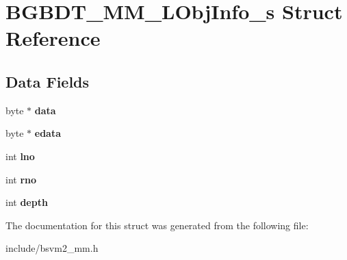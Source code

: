 \hypertarget{structBGBDT__MM__LObjInfo__s}{\section{B\-G\-B\-D\-T\-\_\-\-M\-M\-\_\-\-L\-Obj\-Info\-\_\-s Struct Reference}
\label{structBGBDT__MM__LObjInfo__s}
}
\subsection*{Data Fields}
\begin{DoxyCompactItemize}
\item 
\hypertarget{structBGBDT__MM__LObjInfo__s_a7348aaf7ba86ba7266399ae3ebfab625}{byte $\ast$ {\bfseries data}}\label{structBGBDT__MM__LObjInfo__s_a7348aaf7ba86ba7266399ae3ebfab625}

\item 
\hypertarget{structBGBDT__MM__LObjInfo__s_ab815aae7cf0237171e381a2a58d46a44}{byte $\ast$ {\bfseries edata}}\label{structBGBDT__MM__LObjInfo__s_ab815aae7cf0237171e381a2a58d46a44}

\item 
\hypertarget{structBGBDT__MM__LObjInfo__s_a8b0935b9838161a3a08265f5bd9ba571}{int {\bfseries lno}}\label{structBGBDT__MM__LObjInfo__s_a8b0935b9838161a3a08265f5bd9ba571}

\item 
\hypertarget{structBGBDT__MM__LObjInfo__s_a2321a57b0bbc255a25ca52381616444d}{int {\bfseries rno}}\label{structBGBDT__MM__LObjInfo__s_a2321a57b0bbc255a25ca52381616444d}

\item 
\hypertarget{structBGBDT__MM__LObjInfo__s_a24b15f57c1bb43fc3cb9f40e87fd87e7}{int {\bfseries depth}}\label{structBGBDT__MM__LObjInfo__s_a24b15f57c1bb43fc3cb9f40e87fd87e7}

\end{DoxyCompactItemize}


The documentation for this struct was generated from the following file\-:\begin{DoxyCompactItemize}
\item 
include/bsvm2\-\_\-mm.\-h\end{DoxyCompactItemize}
